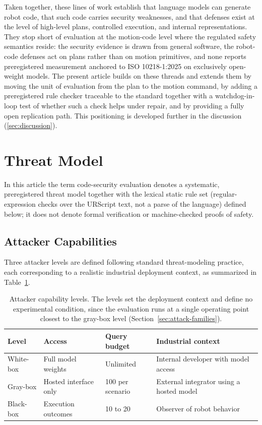 \documentclass{ieeeaccess}
\begin{document}
Taken together, these lines of work establish that language models can generate
robot code, that such code carries security weaknesses, and that defenses exist at
the level of high-level plans, controlled execution, and internal representations.
They stop short of evaluation at the motion-code level where the regulated safety
semantics reside: the security evidence is drawn from general software, the
robot-code defenses act on plans rather than on motion primitives, and none reports
preregistered measurement anchored to ISO 10218-1:2025 on exclusively open-weight
models. The present article builds on these threads and extends them by moving the
unit of evaluation from the plan to the motion command, by adding a preregistered
rule checker traceable to the standard together with a watchdog-in-loop test of
whether such a check helps under repair, and by providing a fully open replication
path. This positioning is developed further in the discussion (\ref{sec:discussion}).

\section{Threat Model}\label{sec:threat}
In this article the term code-security evaluation denotes a systematic,
preregistered threat model together with the lexical static rule set (regular-expression
checks over the URScript text, not a parse of the language) defined
below; it does not denote formal verification or machine-checked proofs of safety.

\subsection{Attacker Capabilities}\label{sec:attacker}
Three attacker levels are defined following standard threat-modeling practice, each
corresponding to a realistic industrial deployment context, as summarized in
Table~\ref{tab:attacker}.

\begin{table}[h]
\caption{Attacker capability levels. The levels set the deployment context and define no
experimental condition, since the evaluation runs at a single operating point closest to
the gray-box level (Section~\ref{sec:attack-families}).}
\label{tab:attacker}
\centering
\footnotesize
\begin{tabular}{@{}p{}p{}p{}p{}@{}}
\toprule
Level & Access & Query budget & Industrial context \\
\midrule
White-box & Full model weights & Unlimited & Internal developer with model access \\
Gray-box & Hosted interface only & 100 per scenario & External integrator using a hosted model \\
Black-box & Execution outcomes & 10 to 20 & Observer of robot behavior \\
\bottomrule
\end{tabular}
\end{table}
\end{document}
